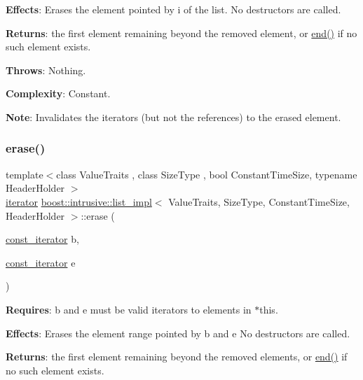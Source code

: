 {\bfseries Effects}\+: Erases the element pointed by i of the list. No destructors are called.

{\bfseries Returns}\+: the first element remaining beyond the removed element, or \hyperlink{classboost_1_1intrusive_1_1list__impl_af2a454471fced6d4b2fb899c50bbee67}{end()} if no such element exists.

{\bfseries Throws}\+: Nothing.

{\bfseries Complexity}\+: Constant.

{\bfseries Note}\+: Invalidates the iterators (but not the references) to the erased element. \mbox{\label{classboost_1_1intrusive_1_1list__impl_a267b1e44859c98eb3dbd9ad865910f61}} 
\subsubsection{\texorpdfstring{erase()}{erase()}\hspace{0.1cm}{\footnotesize\ttfamily [2/3]}}
{\footnotesize\ttfamily template$<$class Value\+Traits , class Size\+Type , bool Constant\+Time\+Size, typename Header\+Holder $>$ \\
\hyperlink{classboost_1_1intrusive_1_1list__impl_a15c0189bf62eb9fb98bc07ef10b8cb23}{iterator} \hyperlink{classboost_1_1intrusive_1_1list__impl}{boost\+::intrusive\+::list\+\_\+impl}$<$ Value\+Traits, Size\+Type, Constant\+Time\+Size, Header\+Holder $>$\+::erase (\begin{DoxyParamCaption}\item[{\hyperlink{classboost_1_1intrusive_1_1list__impl_af4ced710fe02662c5650d161af83d8cd}{const\+\_\+iterator}}]{b,  }\item[{\hyperlink{classboost_1_1intrusive_1_1list__impl_af4ced710fe02662c5650d161af83d8cd}{const\+\_\+iterator}}]{e }\end{DoxyParamCaption})\hspace{0.3cm}{\ttfamily [inline]}}

{\bfseries Requires}\+: b and e must be valid iterators to elements in $\ast$this.

{\bfseries Effects}\+: Erases the element range pointed by b and e No destructors are called.

{\bfseries Returns}\+: the first element remaining beyond the removed elements, or \hyperlink{classboost_1_1intrusive_1_1list__impl_af2a454471fced6d4b2fb899c50bbee67}{end()} if no such element exists.

